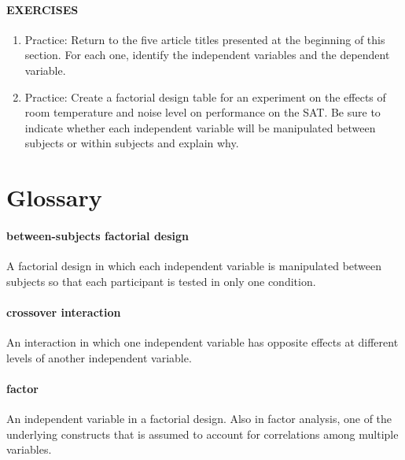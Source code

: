 \documentclass[
]{krantz}
\providecommand{\tightlist}{%
  \setlength{\itemsep}{0pt}\setlength{\parskip}{0pt}}
\begin{document}
\paragraph*{EXERCISES}\label{exercises-13}

\begin{enumerate}
\def\labelenumi{\arabic{enumi}.}
\tightlist
\item
  Practice: Return to the five article titles presented at the beginning of this section. For each one, identify the independent variables and the dependent variable.
\item
  Practice: Create a factorial design table for an experiment on the effects of room temperature and noise level on performance on the SAT. Be sure to indicate whether each independent variable will be manipulated between subjects or within subjects and explain why.
\end{enumerate}

\section{Glossary}\label{glossary-5}

\paragraph*{between-subjects factorial design}\label{between-subjects-factorial-design}

A factorial design in which each independent variable is manipulated between subjects so that each participant is tested in only one condition.

\paragraph*{crossover interaction}\label{crossover-interaction}

An interaction in which one independent variable has opposite effects at different levels of another independent variable.

\paragraph*{factor}\label{factor}

An independent variable in a factorial design. Also in factor analysis, one of the underlying constructs that is assumed to account for correlations among multiple variables.
\end{document}
